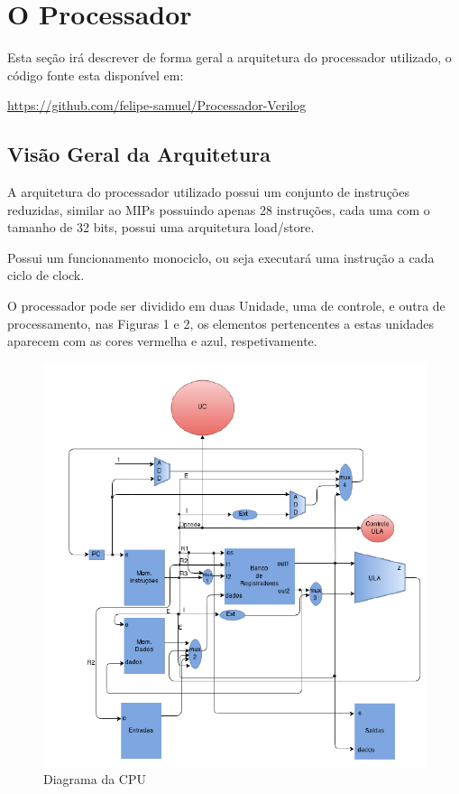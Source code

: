 \section{O Processador}

Esta seção irá descrever de forma geral a arquitetura do processador utilizado, o código fonte esta disponível em:

\url{https://github.com/felipe-samuel/Processador-Verilog}

\subsection{Visão Geral da Arquitetura}  

A arquitetura do processador utilizado possui um conjunto de instruções reduzidas,
similar ao MIPs possuindo apenas 28 instruções, cada uma com o tamanho de
32 bits, possui uma arquitetura load/store.

Possui um funcionamento monociclo, ou seja executará uma instrução a
cada ciclo de clock.

O processador pode ser dividido em duas Unidade, uma de controle, e outra de processamento, nas Figuras 1 e 2, os elementos pertencentes a estas unidades aparecem com as cores vermelha e azul, respetivamente.


\begin{figure}[!htb]
\begin{center}
\includegraphics[scale=0.9]{figuras/Diagrama_da_cpu.jpeg} 
\end{center}
\caption{Diagrama da CPU}
\end{figure}


